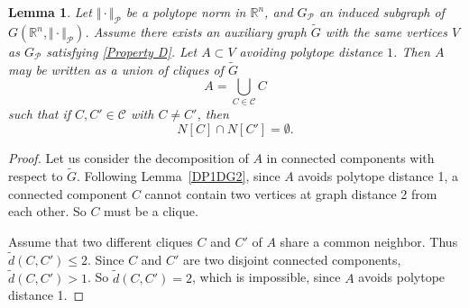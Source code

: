 \documentclass{amsart}                     %
\newtheorem{lemm}{Lemma}
\newcommand{\R}{{\mathbb R}}
\newcommand{\lref}[1]{Lemma~\textup{\ref{#1}}}
\begin{document}
\begin{lemm}\label{LemmeVoisinagesDisjoints} 
Let $\Vert  \cdot \Vert_\mathcal{P}$ be a polytope norm in $\R^n$, and $G_\mathcal{P}$ an induced subgraph of $G(\R^n,\Vert \cdot \Vert_\mathcal{P})$. Assume there exists an auxiliary graph $\tilde{G}$ with the same vertices $V$ as $G_\mathcal{P}$ satisfying \eqref{Property D}. Let $A\subset V$ avoiding polytope distance $1$. Then $A$ may be written as a union of cliques of $\tilde{G}$
$$ A=\bigcup_{C\in\mathcal{C}} C $$ 
such  that  if $C,C'\in \mathcal{C}$ with $C\neq C'$, then 
$$N[C]\cap N[C']=\emptyset.$$
\end{lemm}

\begin{proof}
Let us consider the decomposition of $A$ in connected components with respect to $\tilde{G}$. Following \lref{DP1DG2}, since $A$ avoids polytope distance 1, a connected component $C$ cannot contain two vertices at graph distance 2 from each other. So $C$ must be a clique. 

Assume that two different cliques $C$ and $C'$ of $A$ share a common neighbor. Thus $\tilde{d}(C,C')\leq 2$. Since $C$ and $C'$ are two disjoint connected components, $\tilde{d}(C,C')>1$. So $\tilde{d}(C,C')=2$, which is impossible, since $A$ avoids polytope distance 1. 
\end{proof}
\end{document}
